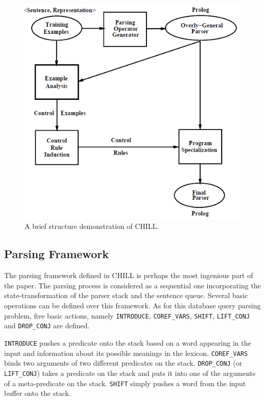 \documentclass[11pt,a4paper]{article}
\begin{document}
\begin{figure}[ht]
\vskip 0.2in
\label{fig2}
\begin{center}
\centerline{\includegraphics[width=\columnwidth]{fig2}}
\caption{A brief structure demonstration of CHILL.}
\end{center}
\vskip -0.2in
\end{figure}

\subsection{Parsing Framework}

The parsing framework defined in CHILL is perhaps the most ingenious part of the paper. The parsing process is considered as a sequential one incorporating the state-transformation of the parser stack and the sentence queue. Several basic operations can be defined over this framework. As for this database query parsing problem, five basic actions, namely \texttt{INTRODUCE}, \texttt{COREF\_VARS}, \texttt{SHIFT}, \texttt{LIFT\_CONJ} and \texttt{DROP\_CONJ} are defined.

\texttt{INTRODUCE} pushes a predicate onto the stack based on a word appearing in the input and information about its possible meanings in the lexicon. \texttt{COREF\_VARS} binds two arguments of two different predicates on the stack. \texttt{DROP\_CONJ} (or \texttt{LIFT\_CONJ}) takes a predicate on the stack and puts it into one of the arguments of a meta-predicate on the stack. \texttt{SHIFT} simply pushes a word from the input buffer onto the stack.
\end{document}

